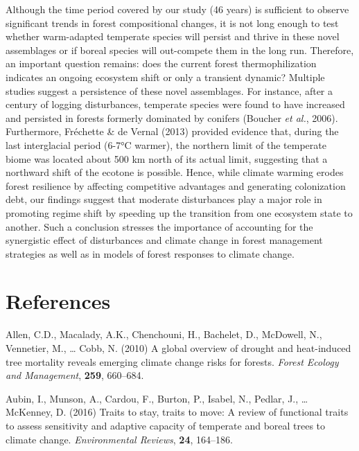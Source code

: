 \documentclass[a4paperpaper,]{article}
\begin{document}
Although the time period covered by our study (46 years) is sufficient
to observe significant trends in forest compositional changes, it is not
long enough to test whether warm-adapted temperate species will persist
and thrive in these novel assemblages or if boreal species will
out-compete them in the long run. Therefore, an important question
remains: does the current forest thermophilization indicates an ongoing
ecosystem shift or only a transient dynamic? Multiple studies suggest a
persistence of these novel assemblages. For instance, after a century of
logging disturbances, temperate species were found to have increased and
persisted in forests formerly dominated by conifers (Boucher \emph{et
al.}, 2006). Furthermore, Fréchette \& de Vernal (2013) provided
evidence that, during the last interglacial period (6-7°C warmer), the
northern limit of the temperate biome was located about 500 km north of
its actual limit, suggesting that a northward shift of the ecotone is
possible. Hence, while climate warming erodes forest resilience by
affecting competitive advantages and generating colonization debt, our
findings suggest that moderate disturbances play a major role in
promoting regime shift by speeding up the transition from one ecosystem
state to another. Such a conclusion stresses the importance of
accounting for the synergistic effect of disturbances and climate change
in forest management strategies as well as in models of forest responses
to climate change.

\pagebreak

\hypertarget{references}{%
\section{References}\label{references}}

\hypertarget{refs}{}
\leavevmode\hypertarget{ref-allen_global_2010}{}%
Allen, C.D., Macalady, A.K., Chenchouni, H., Bachelet, D., McDowell, N.,
Vennetier, M., \ldots{} Cobb, N. (2010) A global overview of drought and
heat-induced tree mortality reveals emerging climate change risks for
forests. \emph{Forest Ecology and Management}, \textbf{259}, 660--684.

\leavevmode\hypertarget{ref-aubin_traits_2016}{}%
Aubin, I., Munson, A., Cardou, F., Burton, P., Isabel, N., Pedlar, J.,
\ldots{} McKenney, D. (2016) Traits to stay, traits to move: A review of
functional traits to assess sensitivity and adaptive capacity of
temperate and boreal trees to climate change. \emph{Environmental
Reviews}, \textbf{24}, 164--186.
\end{document}
